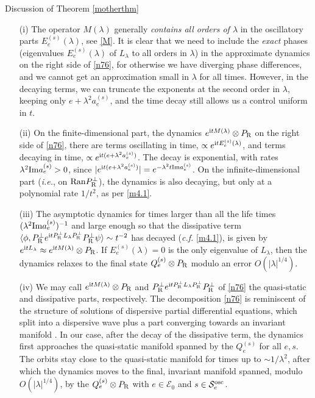 \documentclass[letterpaper,onecolumn,11pt,accepted=2021-12-09]{quantumarticle}
\numberwithin{equation}{section}
\newcommand{\aes}{a_e^{(s)}}
\renewcommand{\r}{{\rm R}}
\renewcommand{\i}{{\rm i}}
\begin{document}
Discussion of Theorem \ref{motherthm} 
\begin{itemize}

\item[(i)] The operator $M(\lambda)$ generally {\em contains all orders of $\lambda$}  in the oscillatory parts $E_e^{(s)}(\lambda)$, see \eqref{M}. It is clear that we need to include the {\em exact} phases (eigenvalues $E_e^{(s)}(\lambda)$ of $L_\lambda$ to all orders in $\lambda$) in the approximate dynamics on the right side of \eqref{n76}, for otherwise we have diverging phase differences, and we cannot get an approximation small in $\lambda$ for all times. However, in the decaying terms, we can truncate the exponents at the second order in $\lambda$, keeping only $e+\lambda^2\aes$, and the time decay still allows us a control uniform in $t$.


\item[(ii)] On the finite-dimensional part, the dynamics  $e^{\i t M(\lambda)}\otimes P_\r$ on the right side of \eqref{n76}, there are terms oscillating in time, $\propto e^{\i t E_e^{(s)}(\lambda)}$, and terms decaying in time, $\propto e^{\i t (e+\lambda^2 a_e^{(s)})}$. The decay is exponential, with rates  $\lambda^2 {\rm Im}a_e^{(s)}>0$, since  $|e^{\i t (e+\lambda^2 a_e^{(s)})}| =e^{-\lambda^2 t{\rm Im}a_e^{(s)}}$. On the infinite-dimensional part ({\em i.e.}, on ${\rm Ran}P_\r^\perp$), the dynamics is also decaying, but only at a polynomial rate $1/t^2$, as per \eqref{m4.1}. 

\item[(iii)] The asymptotic dynamics for times larger than all the life times $(\lambda^2 {\rm Im}a_e^{(s)})^{-1}$ and large enough so that the dissipative term $\langle \phi, P^\perp_\r e^{\i t P^\perp_\r L_\lambda P^\perp_\r} P^\perp_\r \psi\rangle\sim t^{-2}$ has decayed ({\em c.f.} \eqref{m4.1}),  is given by $e^{\i t L_\lambda} \approx e^{\i t M(\lambda)}\otimes P_\r$. If $E_e^{(s)}(\lambda)=0$ is the only eigenvalue of $L_\lambda$, then the dynamics relaxes to the final state $Q_e^{(s)}\otimes P_\r$ modulo an error $O(|\lambda|^{1/4})$. 

\item[(iv)] We may call $e^{\i t M(\lambda)}\otimes P_\r$ and  $ P^\perp_\r e^{\i t P^\perp_\r L_\lambda P^\perp_\r} P^\perp_\r$ of \eqref{n76} the quasi-static and dissipative parts, respectively. The decomposition \eqref{n76} is reminiscent of the structure of solutions of dispersive partial differential equations, which split into a dispersive wave plus a part converging towards an invariant manifold \cite{PW,SW}. In our case, after the decay of the dissipative term, the dynamics first approaches the quasi-static manifold spanned by the $Q_e^{(s)}$ for all $e, s$. The orbits stay close to the quasi-static manifold for times up to $\sim 1/\lambda^2$, after which the dynamics moves to the final,  invariant manifold spanned, modulo $O(|\lambda|^{1/4})$,  by the $Q_e^{(s)}\otimes P_\r$ with $e\in{\mathcal E}_0$ and $s\in{\mathcal S}_e^{\rm osc}$.




\end{itemize}
\end{document}
